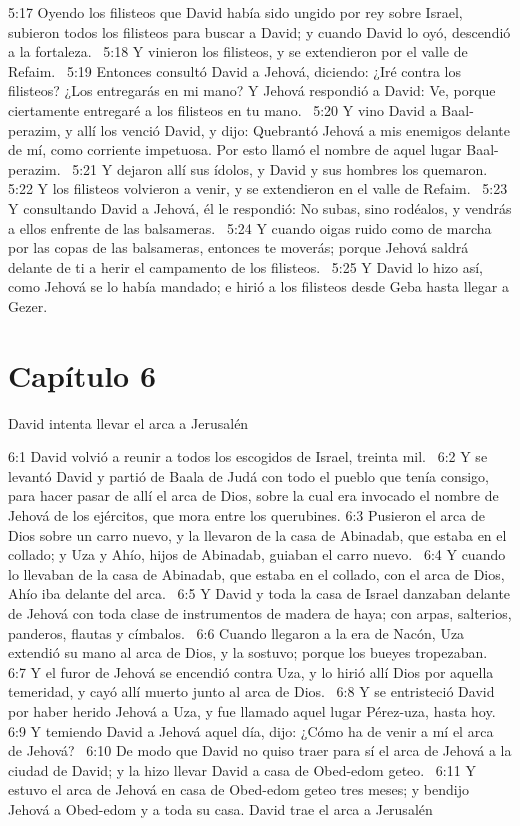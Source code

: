 5:17 Oyendo los filisteos que David había sido ungido por rey sobre Israel, subieron todos los filisteos para buscar a David; y cuando David lo oyó, descendió a la fortaleza.  
5:18 Y vinieron los filisteos, y se extendieron por el valle de Refaim.  
5:19 Entonces consultó David a Jehová, diciendo: ¿Iré contra los filisteos? ¿Los entregarás en mi mano? Y Jehová respondió a David: Ve, porque ciertamente entregaré a los filisteos en tu mano.  
5:20 Y vino David a Baal-perazim, y allí los venció David, y dijo: Quebrantó Jehová a mis enemigos delante de mí, como corriente impetuosa. Por esto llamó el nombre de aquel lugar Baal-perazim.  
5:21 Y dejaron allí sus ídolos, y David y sus hombres los quemaron.  
5:22 Y los filisteos volvieron a venir, y se extendieron en el valle de Refaim.  
5:23 Y consultando David a Jehová, él le respondió: No subas, sino rodéalos, y vendrás a ellos enfrente de las balsameras.  
5:24 Y cuando oigas ruido como de marcha por las copas de las balsameras, entonces te moverás; porque Jehová saldrá delante de ti a herir el campamento de los filisteos.  
5:25 Y David lo hizo así, como Jehová se lo había mandado; e hirió a los filisteos desde Geba hasta llegar a Gezer.  
\section*{Capítulo 6}
David intenta llevar el arca a Jerusalén  


6:1 David volvió a reunir a todos los escogidos de Israel, treinta mil.  
6:2 Y se levantó David y partió de Baala de Judá con todo el pueblo que tenía consigo, para hacer pasar de allí el arca de Dios, sobre la cual era invocado el nombre de Jehová de los ejércitos, que mora entre los querubines. 
6:3 Pusieron el arca de Dios sobre un carro nuevo, y la llevaron de la casa de Abinadab, que estaba en el collado; y Uza y Ahío, hijos de Abinadab, guiaban el carro nuevo.  
6:4 Y cuando lo llevaban de la casa de Abinadab, que estaba en el collado, con el arca de Dios, Ahío iba delante del arca.  
6:5 Y David y toda la casa de Israel danzaban delante de Jehová con toda clase de instrumentos de madera de haya; con arpas, salterios, panderos, flautas y címbalos.  
6:6 Cuando llegaron a la era de Nacón, Uza extendió su mano al arca de Dios, y la sostuvo; porque los bueyes tropezaban.  
6:7 Y el furor de Jehová se encendió contra Uza, y lo hirió allí Dios por aquella temeridad, y cayó allí muerto junto al arca de Dios.  
6:8 Y se entristeció David por haber herido Jehová a Uza, y fue llamado aquel lugar Pérez-uza, hasta hoy.  
6:9 Y temiendo David a Jehová aquel día, dijo: ¿Cómo ha de venir a mí el arca de Jehová?  
6:10 De modo que David no quiso traer para sí el arca de Jehová a la ciudad de David; y la hizo llevar David a casa de Obed-edom geteo.  
6:11 Y estuvo el arca de Jehová en casa de Obed-edom geteo tres meses; y bendijo Jehová a Obed-edom y a toda su casa. 
David trae el arca a Jerusalén  

